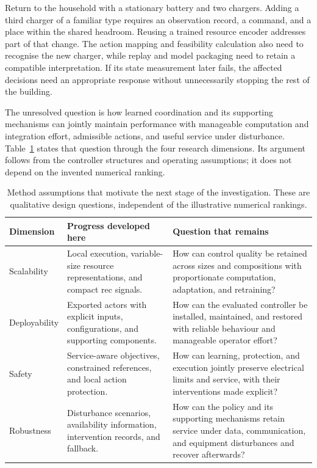 Return to the household with a stationary battery and two chargers. Adding a third charger of a familiar type requires an observation record, a command, and a place within the shared headroom. Reusing a trained resource encoder addresses part of that change. The action mapping and feasibility calculation also need to recognise the new charger, while replay and model packaging need to retain a compatible interpretation. If its state measurement later fails, the affected decisions need an appropriate response without unnecessarily stopping the rest of the building.

The unresolved question is how learned coordination and its supporting mechanisms can jointly maintain performance with manageable computation and integration effort, admissible actions, and useful service under disturbance. Table~\ref{tab:control-solved-problems} states that question through the four research dimensions. Its argument follows from the controller structures and operating assumptions; it does not depend on the invented numerical ranking.

\begin{table}[htbp]
\centering
\caption{Method assumptions that motivate the next stage of the investigation. These are qualitative design questions, independent of the illustrative numerical rankings.}
\label{tab:control-solved-problems}
\small
\begin{tabularx}{\textwidth}{@{}p{}XX@{}}
\toprule
\textbf{Dimension} & \textbf{Progress developed here} & \textbf{Question that remains}\\
\midrule
Scalability & Local execution, variable-size resource representations, and compact \gls{rec} signals. & How can control quality be retained across sizes and compositions with proportionate computation, adaptation, and retraining?\\
\addlinespace
Deployability & Exported actors with explicit inputs, configurations, and supporting components. & How can the evaluated controller be installed, maintained, and restored with reliable behaviour and manageable operator effort?\\
\addlinespace
Safety & Service-aware objectives, constrained references, and local action protection. & How can learning, protection, and execution jointly preserve electrical limits and service, with their interventions made explicit?\\
\addlinespace
Robustness & Disturbance scenarios, availability information, intervention records, and fallback. & How can the policy and its supporting mechanisms retain service under data, communication, and equipment disturbances and recover afterwards?\\
\bottomrule
\end{tabularx}
\end{table}


